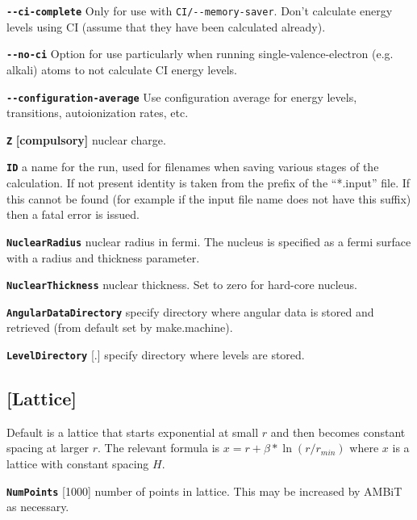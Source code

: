 \documentclass[a4paper,11pt]{article}
\newcommand{\option}[1]{\smallskip\noindent\textbf{\texttt{#1}}}
\newcommand{\code}[1]{\texttt{#1}}
\begin{document}
\option{-{}-ci-complete} Only for use with \code{CI/-{}-memory-saver}. Don't calculate energy levels using CI (assume that they have been calculated already).

\option{-{}-no-ci} Option for use particularly when running single-valence-electron (e.g. alkali) atoms to not calculate CI energy levels.

\option{-{}-configuration-average} Use configuration average for energy levels, transitions, autoionization rates, etc.

\option{Z} \textbf{[compulsory]} nuclear charge.


\option{ID} a name for the run, used for filenames when saving various stages of the calculation. If not present identity is taken from the prefix of the ``*.input'' file. If this cannot be found (for example if the input file name does not have this suffix) then a fatal error is issued.


\option{NuclearRadius} nuclear radius in fermi. The nucleus is specified as a fermi surface with a radius and thickness parameter.

\option{NuclearThickness} nuclear thickness. Set to zero for hard-core nucleus.

\option{AngularDataDirectory} specify directory where angular data is stored and retrieved (from default set by make.machine).

\option{LevelDirectory} [.] specify directory where levels are stored.

\subsection{[Lattice]}
Default is a lattice that starts exponential at small $r$ and then becomes constant spacing at larger $r$. The relevant formula is $x = r + \beta*\ln(r/r_{min})$ where $x$ is a lattice with constant spacing $H$.

\option{NumPoints} [1000] number of points in lattice. This may be increased by AMBiT as necessary.
\end{document}
